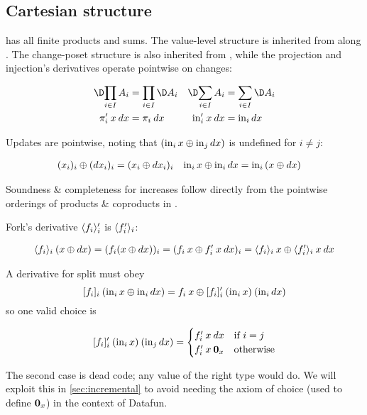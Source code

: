 \documentclass[nomarginums]{rntz}\usepackage[tablet]{fantasy}%
\begin{document}

\subsection{Cartesian structure}
\label{sec:CP-cartesian}

\CP{} has all finite products and sums. The value-level structure is inherited
from \Poset{} along \valfn{}. The change-poset structure is also inherited from
\Poset{}, while the projection and injection's derivatives operate pointwise on
changes:

\begin{align*}
  \chgs{\prod_{i \in I} A_i} &= \prod_{i \in I} \chgs A_i &
  \chgs{\sum_{i \in I} A_i} &= \sum_{i \in I} \chgs A_i
  \\
  \deriv\pi_i\<x\<\dx &= \pi_i\<\dx & \deriv\injc_i\<x\<\dx &= \inj i \dx
\end{align*}

\noindent Updates are pointwise, noting that $(\mathrm{in}_{i}\, x \mathbin{\oplus} \mathrm{in}_{j}\, dx)$ is
undefined for $i \ne j$:

\begin{align*}
  (x_i)_i \mathbin{\oplus} (dx_i)_i &= (x_i \mathbin{\oplus} dx_i)_i &
  \mathrm{in}_{i}\, x \mathbin{\oplus} \mathrm{in}_{i}\, dx &= \mathrm{in}_{i}\, (x \mathbin{\oplus} dx)
\end{align*}

\noindent
Soundness \& completeness for increases follow directly from the pointwise
orderings of products \& coproducts in \Poset{}.

Fork's derivative $\langle{f_i}\rangle_i'$ is $\langle{\ensuremath{f'}_i}\rangle_i$:

\begin{gather*}
  \fork{f_i}_i \<(x \upd \dx)
  = (f_i(x \upd \dx))_i
  = (f_i\<x \upd \deriv f_i \<x \<\dx)_i
  = \fork{f_i}_i \<x \upd \fork{\deriv f_i}_i \<x \<\dx
\end{gather*}

\noindent
A derivative for split must obey \[ \krof{f_i}_i\<(\inj i x \upd \inj i \dx)
= f_i\<x \upd \deriv{\krof{f_i}_i} \<(\inj i x) \<(\inj i \dx) \] so one
valid choice is

\[\deriv{\krof{f_i}_i} \<(\inj i x) \<(\inj j \dx)
=
\begin{cases}
  \deriv f_i \<x \<\dx & \text{if}~i = j\\
  \deriv f_i \<x \<\zero_x & \text{otherwise}
\end{cases}
\]

\noindent
The second case is dead code; any value of the right type would do. We will
exploit this in \cref{sec:incremental} to avoid needing the axiom of choice
(used to define $\boldsymbol{0}_x$) in the context of Datafun.
\end{document}
